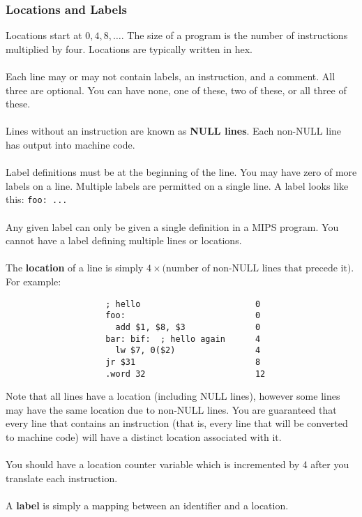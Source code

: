 \documentclass[]{article}
\theoremstyle{definition}
\begin{document}
			\subsubsection{Locations and Labels}
				Locations start at $0, 4, 8, \ldots$. The size of a program is the number of instructions multiplied by four. Locations are typically written in hex.
				\\ \\
				Each line may or may not contain labels, an instruction, and a comment. All three are optional. You can have none, one of these, two of these, or all three of these.
				\\ \\
				Lines without an instruction are known as \textbf{NULL lines}. Each non-NULL line has output into machine code.
				\\ \\
				Label definitions must be at the beginning of the line. You may have zero of more labels on a line. Multiple labels are permitted on a single line. A label looks like this: \verb+foo: ...+
				\\ \\
				Any given label can only be given a single definition in a MIPS program. You cannot have a label defining multiple lines or locations.
				\\ \\
				The \textbf{location} of a line is simply $4 \times \text{(number of non-NULL lines that precede it)}$. For example:
				\begin{verbatim}
					; hello                       0
					foo:                          0
					  add $1, $8, $3              0
					bar: bif:  ; hello again      4
					  lw $7, 0($2)                4
					jr $31                        8
					.word 32                      12
				\end{verbatim}
				Note that all lines have a location (including NULL lines), however some lines may have the same location due to non-NULL lines. You are guaranteed that every line that contains an instruction (that is, every line that will be converted to machine code) will have a distinct location associated with it.
				\\ \\
				You should have a location counter variable which is incremented by 4 after you translate each instruction.
				\\ \\
				A \textbf{label} is simply a mapping between an identifier and a location.
\end{document}
